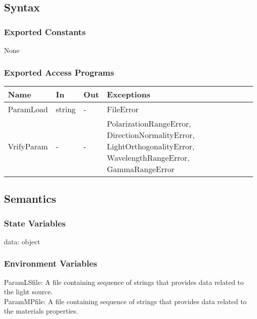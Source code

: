 \documentclass[12pt, titlepage]{article}
\begin{document}
	\subsection{Syntax}
	
	\subsubsection{Exported Constants} None
	
	\subsubsection{Exported Access Programs}
	
	\begin{center} \begin{tabular}{p{3cm} p{2cm} p{2cm} p{8cm}} \hline \textbf{Name}
			& \textbf{In} & \textbf{Out} & \textbf{Exceptions} \\ \hline ParamLoad & string
			& - & FileError\\ VrifyParam & - & - & PolarizationRangeError,
			DirectionNormalityError, LightOrthogonalityError,  WavelengthRangeError,
			GammaRangeError\\
			
			\hline \end{tabular} \end{center}
	
	\subsection{Semantics}
	
	\subsubsection{State Variables}
	
	data: object
	
	\subsubsection{Environment Variables} ParamLSfile: A file containing sequence of
	strings that provides data related to the light source. \\ ParamMPfile: A file
	containing sequence of strings that provides data related to the materials
	properties.
	
\end{document}
